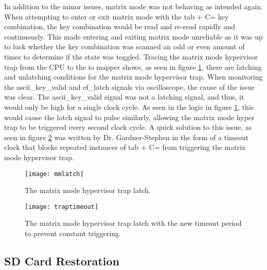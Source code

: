 In addition to the minor issues, matrix mode was not behaving as intended again. When attempting to enter or exit matrix mode with the tab + C= key combination, the key combination would be read and re-read rapidly and continuously. This made entering and exiting matrix mode unreliable as it was up to luck whether the key combination was scanned an odd or even amount of times to determine if the state was toggled. Tracing the matrix mode hypervisor trap from the CPU to the io mapper shows, as seen in figure \ref{fig:mmlatch}, there are latching and unlatching conditions for the matrix mode hypervisor trap. When monitoring the ascii\_key\_valid and ef\_latch signals via oscilloscope, the cause of the issue was clear. The ascii\_key\_valid signal was not a latching signal, and thus, it would only be high for a single clock cycle. As seen in the logic in figure \ref{fig:mmlatch}, this would cause the latch signal to pulse similarly, allowing the matrix mode hyper trap to be triggered every second clock cycle. A quick solution to this issue, as seen in figure \ref{fig:traptimeout} was written by Dr. Gardner-Stephen in the form of a timeout clock that blocks repeated instances of tab + C= from triggering the matrix mode hypervisor trap.

\begin{figure}
  \centering
  \texttt{[image: mmlatch]}
  \caption{The matrix mode hypervisor trap latch.}
  \label{fig:mmlatch}
\end{figure}

\begin{figure}
  \centering
  \texttt{[image: traptimeout]}
  \caption{The matrix mode hypervisor trap latch with the new timeout period to prevent constant triggering.}
  \label{fig:traptimeout}
\end{figure}

\subsection{SD Card Restoration}

\label{Ch6 Sec2 Sub2}

